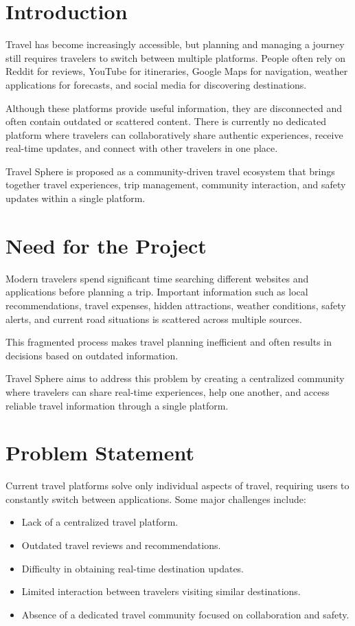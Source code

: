 \documentclass[12pt,a4paper]{article}
\begin{document}

\tableofcontents
\newpage


\section{Introduction}
Travel has become increasingly accessible, but planning and managing a journey still requires travelers to switch between multiple platforms. People often rely on Reddit for reviews, YouTube for itineraries, Google Maps for navigation, weather applications for forecasts, and social media for discovering destinations.

Although these platforms provide useful information, they are disconnected and often contain outdated or scattered content. There is currently no dedicated platform where travelers can collaboratively share authentic experiences, receive real-time updates, and connect with other travelers in one place.

Travel Sphere is proposed as a community-driven travel ecosystem that brings together travel experiences, trip management, community interaction, and safety updates within a single platform.

\section{Need for the Project}
Modern travelers spend significant time searching different websites and applications before planning a trip. Important information such as local recommendations, travel expenses, hidden attractions, weather conditions, safety alerts, and current road situations is scattered across multiple sources.

This fragmented process makes travel planning inefficient and often results in decisions based on outdated information.

Travel Sphere aims to address this problem by creating a centralized community where travelers can share real-time experiences, help one another, and access reliable travel information through a single platform.

\section{Problem Statement}
Current travel platforms solve only individual aspects of travel, requiring users to constantly switch between applications. Some major challenges include:
\begin{itemize}
    \item Lack of a centralized travel platform.
    \item Outdated travel reviews and recommendations.
    \item Difficulty in obtaining real-time destination updates.
    \item Limited interaction between travelers visiting similar destinations.
    \item Absence of a dedicated travel community focused on collaboration and safety.
\end{itemize}
\end{document}
